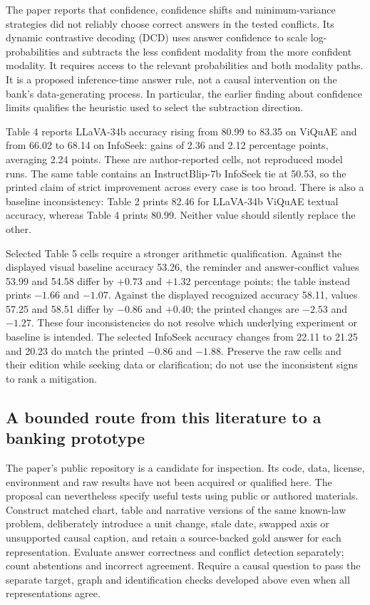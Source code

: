 The paper reports that confidence, confidence shifts and minimum-variance
strategies did not reliably choose correct answers in the tested conflicts.
Its dynamic contrastive decoding (DCD) uses answer confidence to scale
log-probabilities and subtracts the less confident modality from the more
confident modality. It requires access to the relevant probabilities and
both modality paths. It is a proposed inference-time answer rule, not a
causal intervention on the bank's data-generating process. In particular,
the earlier finding about confidence limits qualifies the heuristic used
to select the subtraction direction.\citep{exec23_cross_modality_conflict}

Table 4 reports LLaVA-34b accuracy rising from 80.99 to 83.35 on ViQuAE and
from 66.02 to 68.14 on InfoSeek: gains of 2.36 and 2.12 percentage points,
averaging 2.24 points. These are author-reported cells, not reproduced model
runs. The same table contains an InstructBlip-7b InfoSeek tie at 50.53, so
the printed claim of strict improvement across every case is too broad.
There is also a baseline inconsistency: Table 2 prints 82.46 for LLaVA-34b
ViQuAE textual accuracy, whereas Table 4 prints 80.99. Neither value should
silently replace the other.\citep{exec23_cross_modality_conflict,exec23_context_reference}

Selected Table 5 cells require a stronger arithmetic qualification. Against
the displayed visual baseline accuracy 53.26, the reminder and answer-conflict
values 53.99 and 54.58 differ by $+0.73$ and $+1.32$ percentage points;
the table instead prints $-1.66$ and $-1.07$. Against the displayed recognized
accuracy 58.11, values 57.25 and 58.51 differ by $-0.86$ and $+0.40$;
the printed changes are $-2.53$ and $-1.27$. These four inconsistencies do
not resolve which underlying experiment or baseline is intended. The selected
InfoSeek accuracy changes from 22.11 to 21.25 and 20.23 do match the printed
$-0.86$ and $-1.88$. Preserve the raw cells and their edition while seeking
data or clarification; do not use the inconsistent signs to rank a mitigation.
\citep{exec23_cross_modality_conflict,exec23_context_reference}

\subsection{A bounded route from this literature to a banking prototype}
\label{exec23:conflict-prototype}

The paper's public repository is a candidate for inspection. Its code, data,
license, environment and raw results have not been acquired or qualified here.
The proposal can nevertheless specify useful tests using public or authored
materials. Construct matched chart, table and narrative versions of the same
known-law problem, deliberately introduce a unit change, stale date, swapped
axis or unsupported causal caption, and retain a source-backed gold answer
for each representation. Evaluate answer correctness and conflict detection
separately; count abstentions and incorrect agreement. Require a causal
question to pass the separate target, graph and identification checks developed
above even when all representations agree.

